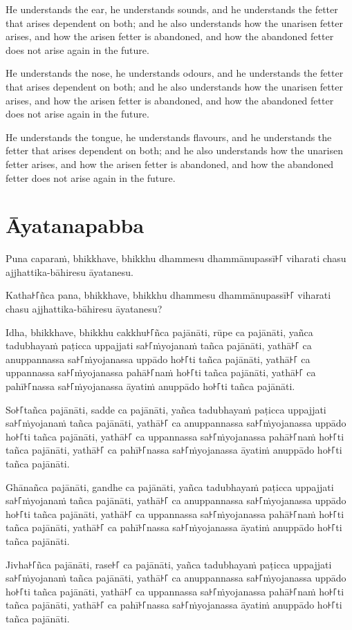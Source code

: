 He understands the ear, he understands sounds, and he understands the fetter
that arises dependent on both; and he also understands how the unarisen fetter
arises, and how the arisen fetter is abandoned, and how the abandoned fetter
does not arise again in the future.

He understands the nose, he understands odours, and he understands the fetter
that arises dependent on both; and he also understands how the unarisen fetter
arises, and how the arisen fetter is abandoned, and how the abandoned fetter
does not arise again in the future.

He understands the tongue, he understands flavours, and he understands the
fetter that arises dependent on both; and he also understands how the unarisen
fetter arises, and how the arisen fetter is abandoned, and how the abandoned
fetter does not arise again in the future.

\paliPage
\section*{Āyatanapabba}

Puna caparaṁ, bhikkhave, bhikkhu dhammesu dhammānupassī꜔꜒ viharati chasu
ajjhattika-bāhiresu āyatanesu.

Katha꜔꜒ñca pana, bhikkhave, bhikkhu dhammesu dhammānupassī꜔꜒ viharati chasu
ajjhattika-bāhiresu āyatanesu?

Idha, bhikkhave, bhikkhu
cakkhu꜔꜒ñca pajānāti,
rūpe ca pajānāti,
yañca tadubhayaṁ paṭicca uppajjati sa꜔꜒ṁyojanaṁ tañca pajānāti,
yathā꜔꜒ ca anuppannassa sa꜔꜒ṁyojanassa uppādo ho꜔꜒ti tañca pajānāti,
yathā꜔꜒ ca uppannassa sa꜔꜒ṁyojanassa pahā꜔꜒naṁ ho꜔꜒ti tañca pajānāti,
yathā꜔꜒ ca pahī꜔꜒nassa sa꜔꜒ṁyojanassa āyatiṁ anuppādo ho꜔꜒ti tañca pajānāti.

So꜔꜒tañca pajānāti,
sadde ca pajānāti,
yañca tadubhayaṁ paṭicca uppajjati sa꜔꜒ṁyojanaṁ tañca pajānāti,
yathā꜔꜒ ca anuppannassa sa꜔꜒ṁyojanassa uppādo ho꜔꜒ti tañca pajānāti,
yathā꜔꜒ ca uppannassa sa꜔꜒ṁyojanassa pahā꜔꜒naṁ ho꜔꜒ti tañca pajānāti,
yathā꜔꜒ ca pahī꜔꜒nassa sa꜔꜒ṁyojanassa āyatiṁ anuppādo ho꜔꜒ti tañca pajānāti.

Ghānañca pajānāti,
gandhe ca pajānāti,
yañca tadubhayaṁ paṭicca uppajjati sa꜔꜒ṁyojanaṁ tañca pajānāti,
yathā꜔꜒ ca anuppannassa sa꜔꜒ṁyojanassa uppādo ho꜔꜒ti tañca pajānāti,
yathā꜔꜒ ca uppannassa sa꜔꜒ṁyojanassa pahā꜔꜒naṁ ho꜔꜒ti tañca pajānāti,
yathā꜔꜒ ca pahī꜔꜒nassa sa꜔꜒ṁyojanassa āyatiṁ anuppādo ho꜔꜒ti tañca pajānāti.

Jivha꜔꜒ñca pajānāti,
rase꜔꜒ ca pajānāti,
yañca tadubhayaṁ paṭicca uppajjati sa꜔꜒ṁyojanaṁ tañca pajānāti,
yathā꜔꜒ ca anuppannassa sa꜔꜒ṁyojanassa uppādo ho꜔꜒ti tañca pajānāti,
yathā꜔꜒ ca uppannassa sa꜔꜒ṁyojanassa pahā꜔꜒naṁ ho꜔꜒ti tañca pajānāti,
yathā꜔꜒ ca pahī꜔꜒nassa sa꜔꜒ṁyojanassa āyatiṁ anuppādo ho꜔꜒ti tañca pajānāti.

